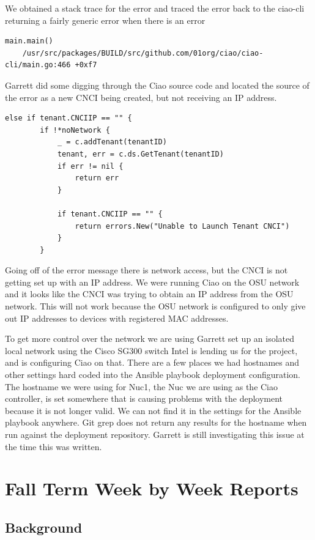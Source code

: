 \documentclass[10pt,onecolumn,journal,draftclsnofoot]{IEEEtran}
\begin{document}
We obtained a stack trace for the error and traced the error back to the
ciao-cli returning a fairly generic error when there is an error 
\begin{lstlisting}[caption = 500 error stack trace portion]
main.main()
    /usr/src/packages/BUILD/src/github.com/01org/ciao/ciao-cli/main.go:466 +0xf7
\end{lstlisting}

Garrett did some digging through the Ciao source code and located the source of
the error as a new CNCI being created, but not receiving an IP address.

\begin{lstlisting}[caption = Unable to launch tenant CNCI error location.]
else if tenant.CNCIIP == "" {
		if !*noNetwork {
			_ = c.addTenant(tenantID)
			tenant, err = c.ds.GetTenant(tenantID)
			if err != nil {
				return err
			}

			if tenant.CNCIIP == "" {
				return errors.New("Unable to Launch Tenant CNCI")
			}
		}
\end{lstlisting}

Going off of the error message there is network access, but the CNCI is not
getting set up with an IP address.
We were running Ciao on the OSU network and it looks like the CNCI was trying
to obtain an IP address from the OSU network. This will not work because the
OSU network is configured to only give out IP addresses to devices with
registered MAC addresses.

To get more control over the network we are using Garrett set up an isolated
local network using the Cisco SG300 switch Intel is lending us for the project,
and is configuring Ciao on that. There are a few places we had hostnames and
other settings hard coded into the Ansible playbook deployment configuration.
The hostname we were using for Nuc1, the Nuc we are using as the Ciao
controller, is set somewhere that is causing problems with the deployment
because it is not longer valid. We can not find it in the settings for the 
Ansible playbook anywhere.
Git grep does not return any results for the hostname when run against the 
deployment repository.
Garrett is still investigating this issue at the time this was written.

\section{Fall Term Week by Week Reports}

\subsection{Background}
\end{document}
